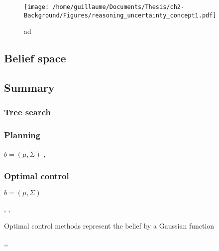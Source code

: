 \begin{figure}[h]
 \centering
 \texttt{[image: /home/guillaume/Documents/Thesis/ch2-Background/Figures/reasoning\_uncertainty\_concept1.pdf]}
 \caption{ad}
\end{figure}




\subsection{Belief space}

%
%
%
\subsection{Summary}
%
%

\cite{Sol_POMDP_Policy_space_1998}

\subsubsection{Tree search}

\subsubsection{Planning}
$b = (\mu,\Sigma)$
\cite{Quadrator_2008},\cite{BelRoadMap_2009}


\subsubsection{Optimal control}
$b = (\mu,\Sigma)$
 
\cite{Erez10ascalable},
\cite{mc_update_ppomdps}, 
\cite{Platt-RSS-10}

 

Optimal control methods represent the belief by a Gaussian function 


\cite{Bayesian_explor_exploit_2009},\cite{Spaan05icra},\cite{Thrun_2005}
 

\cite{Rand_belief_space_replanning}
 
 
 \cite{Ross08onlineplanning}
 
